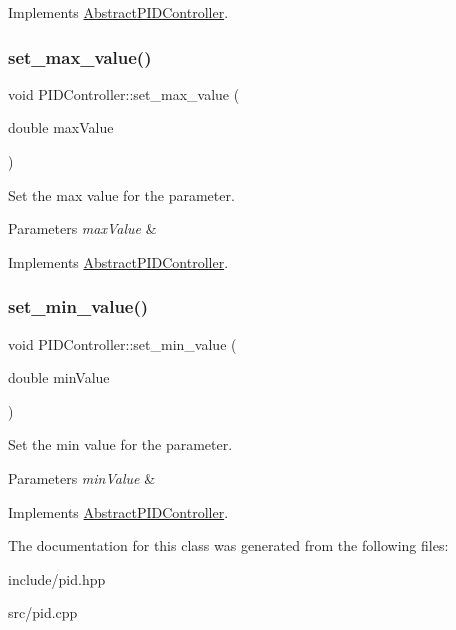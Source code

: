 Implements \hyperlink{classAbstractPIDController}{Abstract\+P\+I\+D\+Controller}.

\mbox{\label{classPIDController_a942161494e6b3bc4996e688f390a59bf}} 
\subsubsection{\texorpdfstring{set\+\_\+max\+\_\+value()}{set\_max\_value()}}
{\footnotesize\ttfamily void P\+I\+D\+Controller\+::set\+\_\+max\+\_\+value (\begin{DoxyParamCaption}\item[{double}]{max\+Value }\end{DoxyParamCaption})\hspace{0.3cm}{\ttfamily [virtual]}}



Set the max value for the parameter. 


\begin{DoxyParams}{Parameters}
{\em max\+Value} & \\
\hline
\end{DoxyParams}


Implements \hyperlink{classAbstractPIDController}{Abstract\+P\+I\+D\+Controller}.

\mbox{\label{classPIDController_a101d69b58ee371c45b1046dcd2bd58e7}} 
\subsubsection{\texorpdfstring{set\+\_\+min\+\_\+value()}{set\_min\_value()}}
{\footnotesize\ttfamily void P\+I\+D\+Controller\+::set\+\_\+min\+\_\+value (\begin{DoxyParamCaption}\item[{double}]{min\+Value }\end{DoxyParamCaption})\hspace{0.3cm}{\ttfamily [virtual]}}



Set the min value for the parameter. 


\begin{DoxyParams}{Parameters}
{\em min\+Value} & \\
\hline
\end{DoxyParams}


Implements \hyperlink{classAbstractPIDController}{Abstract\+P\+I\+D\+Controller}.



The documentation for this class was generated from the following files\+:\begin{DoxyCompactItemize}
\item 
include/pid.\+hpp\item 
src/pid.\+cpp\end{DoxyCompactItemize}

